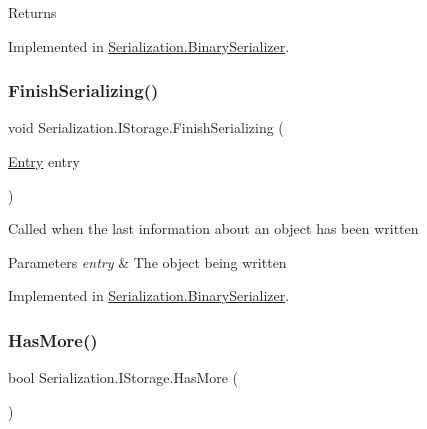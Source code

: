 \begin{DoxyReturn}{Returns}

\end{DoxyReturn}


Implemented in \hyperlink{class_serialization_1_1_binary_serializer_a33f7f74fffe31b07a96ab08fa545e990}{Serialization.\+Binary\+Serializer}.

\mbox{\label{interface_serialization_1_1_i_storage_a03e6828bebedaa8ec17e5f01a7cbd689}} 
\subsubsection{\texorpdfstring{Finish\+Serializing()}{FinishSerializing()}}
{\footnotesize\ttfamily void Serialization.\+I\+Storage.\+Finish\+Serializing (\begin{DoxyParamCaption}\item[{\hyperlink{class_serialization_1_1_entry}{Entry}}]{entry }\end{DoxyParamCaption})}



Called when the last information about an object has been written 


\begin{DoxyParams}{Parameters}
{\em entry} & The object being written\\
\hline
\end{DoxyParams}


Implemented in \hyperlink{class_serialization_1_1_binary_serializer_a026959038d36c07fc77d6da1345ab4d2}{Serialization.\+Binary\+Serializer}.

\mbox{\label{interface_serialization_1_1_i_storage_a167bf2c224e928c05446f0fde56e9d8d}} 
\subsubsection{\texorpdfstring{Has\+More()}{HasMore()}}
{\footnotesize\ttfamily bool Serialization.\+I\+Storage.\+Has\+More (\begin{DoxyParamCaption}{ }\end{DoxyParamCaption})}



